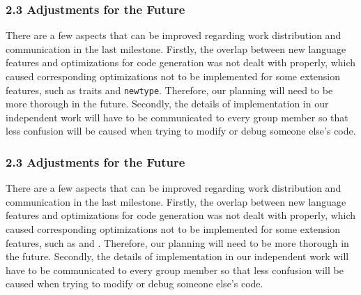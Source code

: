 \documentclass[10pt,a4paper]{report}
\begin{document}
  \subsubsection*{2.3 Adjustments for the Future}
  There are a few aspects that can be improved regarding work distribution and
  communication in the last milestone. Firstly, the overlap between new language
  features and optimizations for code generation was not dealt with properly,
  which caused corresponding optimizations not to be implemented for some
  extension features, such as traits and \texttt{newtype}. Therefore, our
  planning will need to be more thorough in the future. Secondly, the details of
  implementation in our independent work will have to be communicated to every
  group member so that less confusion will be caused when trying to modify or
  debug someone else’s code.



  \subsubsection*{2.3	Adjustments for the Future}
  There are a few aspects that can be improved regarding work distribution and communication
   in the last milestone. Firstly, the overlap between new language features and 
   optimizations for code generation was not dealt with properly, which caused corresponding 
   optimizations not to be implemented for some extension features, such as  and 
   . Therefore, our planning will need to be more thorough in the future. 
   Secondly, the details of implementation in our independent work will have to be communicated 
   to every group member so that less confusion will be caused when trying to modify or debug 
   someone else’s code.
\end{document}
